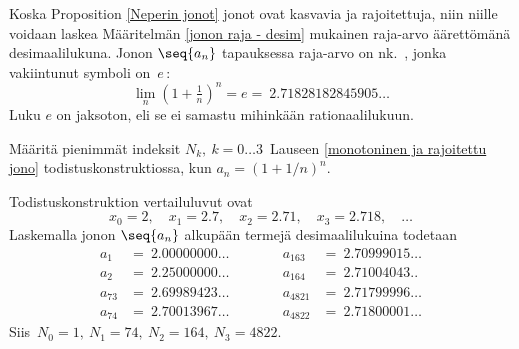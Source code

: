 Koska Proposition \ref{Neperin jonot} jonot ovat kasvavia ja rajoitettuja, niin niille
voidaan laskea Määritelmän \ref{jonon raja - desim} mukainen raja-arvo äärettömänä
desimaalilukuna. Jonon $\seq{a_n}$ tapauksessa raja-arvo on nk.\ , jonka
vakiintunut symboli on $\,e\,$:
\[
\lim_n (1+\tfrac{1}{n})^n = e =\ 2.71828182845905 \ldots
\]
Luku $e$ on jaksoton, eli se ei samastu mihinkään rationaalilukuun. 
\begin{Exa} Määritä pienimmät indeksit $N_k,\ k=0\ldots 3\,$ Lauseen
\ref{monotoninen ja rajoitettu jono} todistuskonstruktiossa, kun $a_n=(1+1/n)^n$.
\end{Exa}
\ratk Todistuskonstruktion vertailuluvut ovat
\[
x_0=2, \quad x_1=2.7, \quad x_2=2.71, \quad x_3=2.718, \quad \ldots
\]
Laskemalla jonon $\seq{a_n}$ alkupään termejä desimaalilukuina todetaan
\[
\begin{aligned}
a_1    &=\ 2.00000000 \ldots \\ 
a_2    &=\ 2.25000000 \ldots \\[2mm] 
a_{73} &=\ 2.69989423 \ldots \\ 
a_{74} &=\ 2.70013967 \ldots
\end{aligned} \qquad\quad
\begin{aligned}
a_{163}   &=\ 2.70999015 \ldots \\
a_{164}   &=\ 2.71004043.. \\[2mm]
a_{4821}  &=\ 2.71799996 \ldots \\
a_{4822}  &=\ 2.71800001 \ldots
\end{aligned}
\]
Siis $\,N_0=1,\ N_1=74,\ N_2=164,\ N_3=4822$. \loppu

